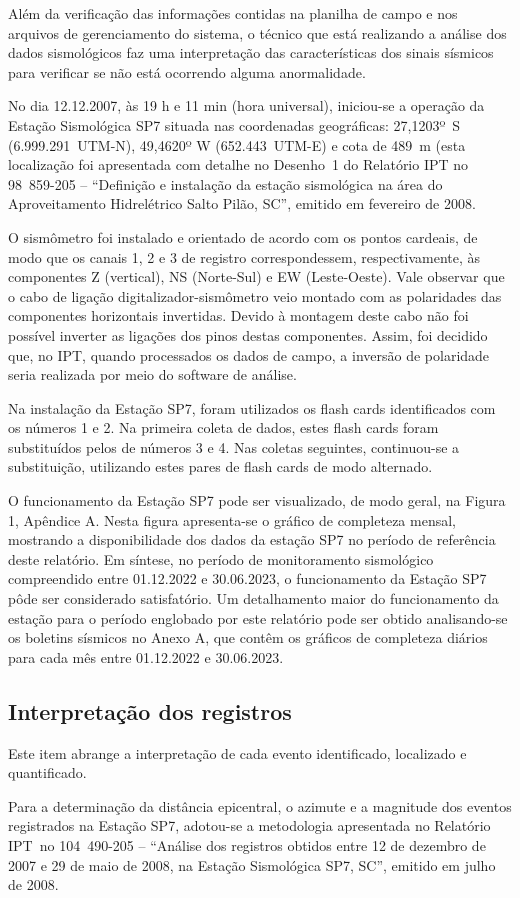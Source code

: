 \par{Além da verificação das informações contidas na planilha de campo e nos arquivos de gerenciamento do sistema, o técnico que está realizando a análise dos dados sismológicos faz uma interpretação das características dos sinais sísmicos para verificar se não está ocorrendo alguma anormalidade.}
\par{No dia 12.12.2007, às 19 h e 11 min (hora universal), iniciou-se a operação da Estação Sismológica SP7 situada nas coordenadas geográficas: 27,1203º S (6.999.291 UTM-N), 49,4620º W (652.443 UTM-E) e cota de 489 m (esta localização foi apresentada com detalhe no Desenho 1 do Relatório IPT no 98 859-205 – “Definição e instalação da estação sismológica na área do Aproveitamento Hidrelétrico Salto Pilão, SC”, emitido em fevereiro de 2008.}
\par{O sismômetro foi instalado e orientado de acordo com os pontos cardeais, de modo que os canais 1, 2 e 3 de registro correspondessem, respectivamente, às componentes Z (vertical), NS (Norte-Sul) e EW (Leste-Oeste). Vale observar que o cabo de ligação digitalizador-sismômetro veio montado com as polaridades das componentes horizontais invertidas. Devido à montagem deste cabo não foi possível inverter as ligações dos pinos destas componentes. Assim, foi decidido que, no IPT, quando processados os dados de campo, a inversão de polaridade seria realizada por meio do software de análise.}
\par{Na instalação da Estação SP7, foram utilizados os flash cards identificados com os números 1 e 2. Na primeira coleta de dados, estes flash cards foram substituídos pelos de números 3 e 4. Nas coletas seguintes, continuou-se a substituição, utilizando estes pares de flash cards de modo alternado.}
\par{O funcionamento da Estação SP7 pode ser visualizado, de modo geral, na Figura 1, Apêndice A. Nesta figura apresenta-se o gráfico de completeza mensal, mostrando a disponibilidade dos dados da estação SP7 no período de referência deste relatório. Em síntese, no período de monitoramento sismológico compreendido entre 01.12.2022 e 30.06.2023, o funcionamento da Estação SP7 pôde ser considerado satisfatório. Um detalhamento maior do funcionamento da estação para o período englobado por este relatório pode ser obtido analisando-se os boletins sísmicos no Anexo A, que contêm os gráficos de completeza diários para cada mês entre 01.12.2022 e 30.06.2023.}

\subsection{Interpretação dos registros}
\label{subsec:interpret}
\par{Este item abrange a interpretação de cada evento identificado, localizado e quantificado.}
\par{Para a determinação da distância epicentral, o azimute e a magnitude dos eventos registrados na Estação SP7, adotou-se a metodologia apresentada no Relatório IPT no 104 490-205 – “Análise dos registros obtidos entre 12 de dezembro de 2007 e 29 de maio de 2008, na Estação Sismológica SP7, SC”, emitido em julho de 2008.}

